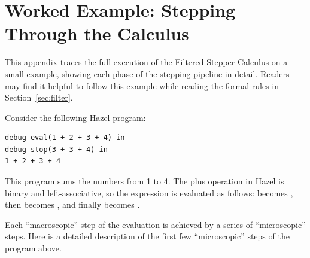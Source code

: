 \section{Worked Example: Stepping Through the Calculus}\label{sec:worked_example}\label{sec:filter_example}

This appendix traces the full execution of the Filtered Stepper
Calculus on a small example, showing each phase of the stepping
pipeline in detail. Readers may find it helpful to follow this
example while reading the formal rules in Section~\ref{sec:filter}.

Consider the following Hazel program:
\lstset{xleftmargin=1in}
\begin{lstlisting}[language=hazel,caption={A simple Hazel program}]
debug eval(1 + 2 + 3 + 4) in
debug stop(3 + 3 + 4) in
1 + 2 + 3 + 4\end{lstlisting}

This program sums the numbers from 1 to 4. The plus operation in Hazel
is binary and left-associative, so the expression
 is evaluated as follows:
 becomes
, then 
becomes , and finally
 becomes
.

Each ``macroscopic'' step of the evaluation is achieved by a series of
``microscopic'' steps. Here is a detailed description of the first few
``microscopic'' steps of the program above.

